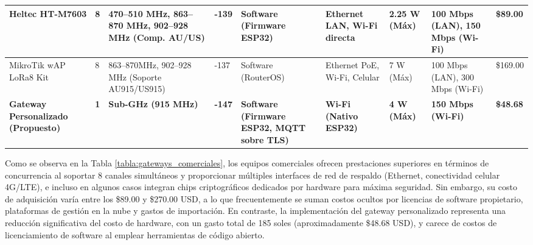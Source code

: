 \begin{landscape}
\begin{table}[H]
\begin{tabular}{|p{2.5cm}|p{1cm}|p{2.5cm}|p{1.7cm}|p{3cm}|p{2.3cm}|p{1.7cm}|p{2cm}|p{1.3cm}|}
            Heltec HT-M7603                                                & 8                              & 470--510 MHz, 863--870 MHz, 902--928 MHz (Comp. AU/US) & -139                              & Software (Firmware ESP32)                                              & Ethernet LAN, Wi-Fi directa                       & 2.25 W (Máx)                           & 100 Mbps (LAN), 150 Mbps (Wi-Fi)              & \$89.00                              \\ \hline
            MikroTik wAP LoRa8 Kit                                         & 8                              & 863--870MHz, 902--928 MHz (Soporte AU915/US915)        & -137                              & Software (RouterOS)                                                    & Ethernet PoE, Wi-Fi, Celular                      & 7 W (Máx)                              & 100 Mbps (LAN), 300 Mbps (Wi-Fi)              & \$169.00                             \\ \hline
            \cellcolor{green!15}\textbf{Gateway Personalizado (Propuesto)} & \cellcolor{green!15}\textbf{1} & \cellcolor{green!15}\textbf{Sub-GHz (915 MHz)}         & \cellcolor{green!15}\textbf{-147} & \cellcolor{green!15}\textbf{Software (Firmware ESP32, MQTT sobre TLS)} & \cellcolor{green!15}\textbf{Wi-Fi (Nativo ESP32)} & \cellcolor{green!15}\textbf{4 W (Máx)} & \cellcolor{green!15}\textbf{150 Mbps (Wi-Fi)} & \cellcolor{green!15}\textbf{\$48.68} \\ \hline
        \end{tabular}
    \end{table}
\end{landscape}
\FloatBarrier

Como se observa en la Tabla \ref{tabla:gateways_comerciales}, los equipos comerciales ofrecen prestaciones superiores en términos de concurrencia al soportar 8 canales simultáneos y proporcionar múltiples interfaces de red de respaldo (Ethernet, conectividad celular 4G/LTE), e incluso en algunos casos integran chips criptográficos dedicados por hardware para máxima seguridad. Sin embargo, su costo de adquisición varía entre los \$89.00 y \$270.00 USD, a lo que frecuentemente se suman costos ocultos por licencias de software propietario, plataformas de gestión en la nube y gastos de importación. En contraste, la implementación del gateway personalizado representa una reducción significativa del costo de hardware, con un gasto total de 185 soles (aproximadamente \$48.68 USD), y carece de costos de licenciamiento de software al emplear herramientas de código abierto.

